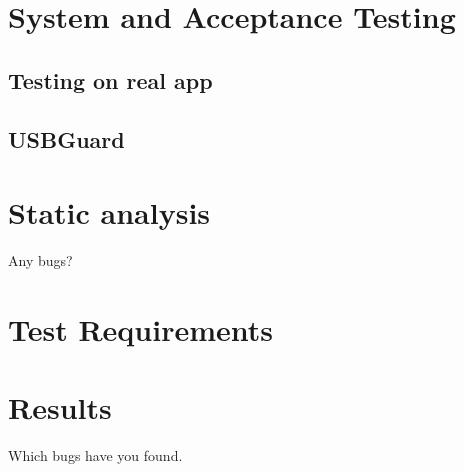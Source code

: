 \section{System and Acceptance Testing}
\subsection{Testing on real app}
\subsection{USBGuard}

\section{Static analysis}
Any bugs?

\section{Test Requirements}

\section{Results}
Which bugs have you found.



